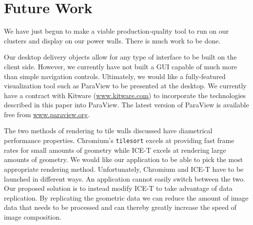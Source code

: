 \documentclass{acmsiggraph}
\newcommand{\sticky}[1]{}
\newcommand{\cidentifier}[1]{\texttt{#1}}
\begin{document}
  \sticky{Comparison of rendering times of Chromium and ICE-T for various
  geometry sizes.  I would have it here already, but after a month I still
  don't have the Chromium stuff working on our cluster.  It's driving me
  nucking futs.}



  \section{Future Work}
  \label{sec:future_work}

  We have just begun to make a viable production-quality tool to run on our
  clusters and display on our power walls.  There is much work to be done.

  Our desktop delivery objects allow for any type of interface to be built
  on the client side.  However, we currently have not built a GUI capable
  of much more than simple navigation controls.  Ultimately, we would like
  a fully-featured visualization tool such as ParaView \cite{Law01} to be
  presented at the desktop.  We currently have a contract with Kitware
  (\href{http://www.kitware.com}{www.kitware.com}) to incorporate the
  technologies described in this paper into ParaView.  The latest version
  of ParaView is available free from
  \href{http://www.paraview.org}{www.paraview.org}.

  The two methods of rendering to tile walls discussed have diametrical
  performance properties.  Chromium's \cidentifier{tile\-sort} excels at
  providing fast frame rates for small amounts of geometry while ICE-T
  excels at rendering large amounts of geometry.  We would like our
  application to be able to pick the most appropriate rendering method.
  Unfortunately, Chromium and ICE-T have to be launched in different ways.
  An application cannot easily switch between the two.  Our proposed
  solution is to instead modify ICE-T to take advantage of data
  replication.  By replicating the geometric data we can reduce the amount
  of image data that needs to be processed and can thereby greatly increase
  the speed of image composition.
\end{document}
